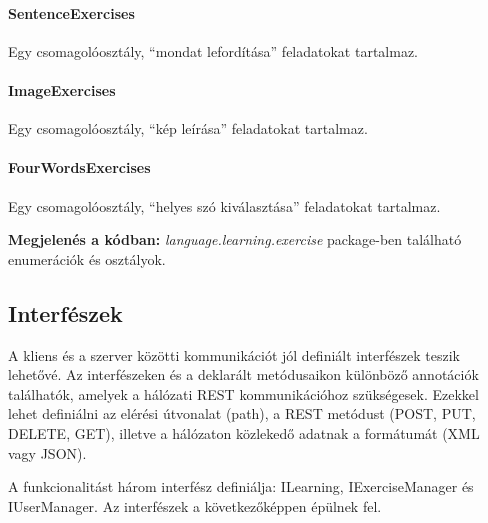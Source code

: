 \documentclass[11pt, a4paper]{article}
\begin{document}
    \paragraph{SentenceExercises} Egy csomagolóosztály, ``mondat lefordítása'' feladatokat tartalmaz.
    
    \paragraph{ImageExercises} Egy csomagolóosztály, ``kép leírása'' feladatokat tartalmaz.
    
    \paragraph{FourWordsExercises} Egy csomagolóosztály, ``helyes szó kiválasztása'' feladatokat tartalmaz.
    
    \textbf{Megjelenés a kódban:} \textit{language.learning.exercise} package-ben található enumerációk és osztályok.
    
    \subsection{Interfészek}
    \label{sec:interfészek}
    
    A kliens és a szerver közötti kommunikációt jól definiált interfészek teszik lehetővé. Az interfészeken és a deklarált metódusaikon különböző annotációk találhatók, amelyek a hálózati REST kommunikációhoz szükségesek. Ezekkel lehet definiálni az elérési útvonalat (path), a REST metódust (POST, PUT, DELETE, GET), illetve a hálózaton közlekedő adatnak a formátumát (XML vagy JSON).
    
    A funkcionalitást három interfész definiálja: ILearning, IExerciseManager és IUserManager. Az interfészek a következőképpen épülnek fel.
    
\end{document}
